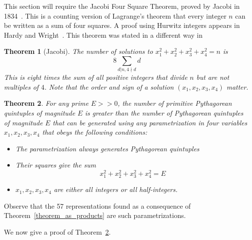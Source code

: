 \documentclass[12pt,table]{article}
\newtheorem{theorem}{Theorem}[section]
\theoremstyle{definition}
\theoremstyle{remark}
\numberwithin{equation}{section}
\begin{document}
This section will require the Jacobi Four Square Theorem, proved by
Jacobi in 1834~\cite{Jacobi}.  This is a counting
version of Lagrange's theorem that every integer $n$ can
be written as a sum of four squares.
A proof using Hurwitz integers appears in
Hardy and Wright~\cite[Chapter XX, Theorem 386]{Hardy_and_Wright}.
This theorem was
stated in a different way in~\cite{Lalin}
\begin{theorem}[Jacobi]
\label{theorem_representations}
The number of solutions to $x_1^2 +  x_2^2 +  x_3^2 +  x_4^2  = n$ is 
\[
8\sum_{d|n,4\nmid d}{d}
\]
This is eight times the sum of all positive integers that divide $n$ but are not multiples of $4$. Note that 
the order and sign of a solution $(x_1,x_2,x_3,x_4)$ matter. 
\end{theorem}


\begin{theorem}
\label{theorem_analysis}
For any prime $E >> 0$, the number of primitive  Pythagorean 
quintuples of magnitude $E$ is greater than the number of 
Pythagorean quintuples of magnitude $E$ that can be generated using 
any parametrization in four variables $x_1, x_2, x_3, x_4$ that
obeys the following conditions:
\begin{itemize}
\item[(i)]
The parametrization always 
generates Pythagorean quintuples

\item[(ii)]
Their squares give the sum
\[
     x_1^2 + x_2^2 + x_3^2 + x_4^2 = E
\]

\item[(iii)]
$x_1, x_2, x_3, x_4$ are either all integers or
all half-integers.
\end{itemize}
\end{theorem}


Observe that the 57 representations found as a consequence of
Theorem~\ref{theorem_as_products} are such parametrizations.


We now give a 
proof of Theorem~\ref{theorem_analysis}.
\end{document}
